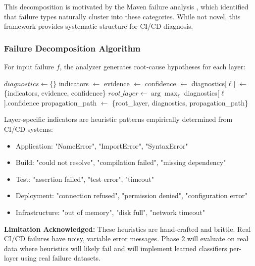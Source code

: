 \documentclass[11pt]{article}
\begin{document}
This decomposition is motivated by the Maven failure analysis \citep{Vasallo2019}, which identified that failure types naturally cluster into these categories. While not novel, this framework provides systematic structure for CI/CD diagnosis.

\subsubsection{Failure Decomposition Algorithm}

For input failure $f$, the analyzer generates root-cause hypotheses for each layer:

\begin{algorithm}
\caption{Hierarchical Failure Analysis}
\begin{algorithmic}[1]
    \State $diagnostics \leftarrow \{\}$
        \State indicators $\leftarrow$ 
        \State evidence $\leftarrow$ 
        \State confidence $\leftarrow$ 
        \State diagnostics[$\ell$] $\leftarrow$ \{indicators, evidence, confidence\}
    \EndFor
    \State $root\_layer \leftarrow \arg\max_\ell$ diagnostics[$\ell$].confidence
    \State propagation\_path $\leftarrow$ 
    \State \Return \{root\_layer, diagnostics, propagation\_path\}
\EndProcedure
\end{algorithmic}
\end{algorithm}

Layer-specific indicators are heuristic patterns empirically determined from CI/CD systems:
\begin{itemize}
    \item Application: "NameError", "ImportError", "SyntaxError"
    \item Build: "could not resolve", "compilation failed", "missing dependency"
    \item Test: "assertion failed", "test error", "timeout"
    \item Deployment: "connection refused", "permission denied", "configuration error"
    \item Infrastructure: "out of memory", "disk full", "network timeout"
\end{itemize}

\textbf{Limitation Acknowledged:} These heuristics are hand-crafted and brittle. Real CI/CD failures have noisy, variable error messages. Phase 2 will evaluate on real data where heuristics will likely fail and will implement learned classifiers per-layer using real failure datasets.
\end{document}
